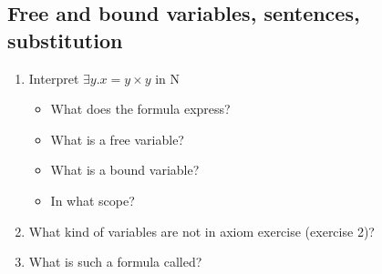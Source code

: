 \documentclass[fleqn]{article}
\begin{document}
\subsection{Free and bound variables, sentences, substitution}
\begin{enumerate}
    \item Interpret $\exists y. x=y\times y$ in N
    \begin{itemize}
        \item What does the formula express?
        \item What is a free variable?
        \item What is a bound variable?
        \item In what scope?
    \end{itemize}
    \item What kind of variables are not in axiom exercise (exercise 2)?
    \item What is such a formula called?
\end{enumerate}
\end{document}
